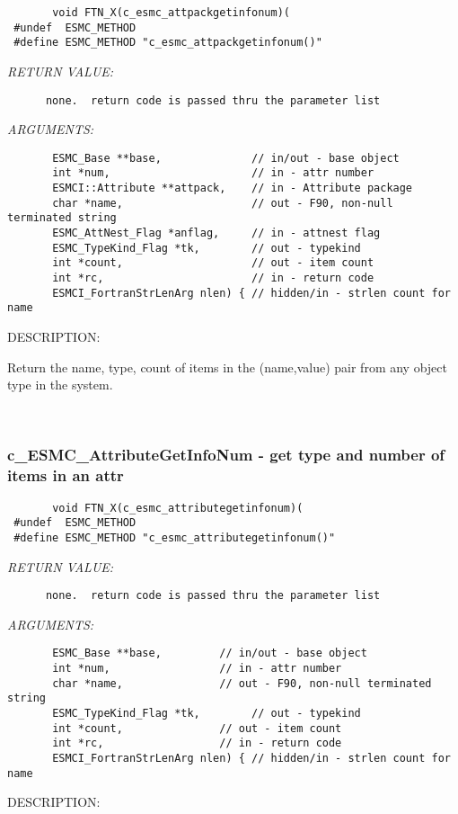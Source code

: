   
\begin{verbatim}       void FTN_X(c_esmc_attpackgetinfonum)(
 #undef  ESMC_METHOD
 #define ESMC_METHOD "c_esmc_attpackgetinfonum()"\end{verbatim}{\em RETURN VALUE:}
\begin{verbatim}      none.  return code is passed thru the parameter list
   \end{verbatim}{\em ARGUMENTS:}
\begin{verbatim}       ESMC_Base **base,              // in/out - base object
       int *num,                      // in - attr number
       ESMCI::Attribute **attpack,    // in - Attribute package
       char *name,                    // out - F90, non-null terminated string
       ESMC_AttNest_Flag *anflag,     // in - attnest flag
       ESMC_TypeKind_Flag *tk,        // out - typekind
       int *count,                    // out - item count
       int *rc,                       // in - return code
       ESMCI_FortranStrLenArg nlen) { // hidden/in - strlen count for name
   \end{verbatim}
{\sf DESCRIPTION:\\ }


     Return the name, type, count of items in the (name,value) pair from any 
     object type in the system.
   
 
\mbox{}\hrulefill\ 
 
\subsubsection [c\_ESMC\_AttributeGetInfoNum] {c\_ESMC\_AttributeGetInfoNum - get type and number of items in an attr}


  
\begin{verbatim}       void FTN_X(c_esmc_attributegetinfonum)(
 #undef  ESMC_METHOD
 #define ESMC_METHOD "c_esmc_attributegetinfonum()"\end{verbatim}{\em RETURN VALUE:}
\begin{verbatim}      none.  return code is passed thru the parameter list
   \end{verbatim}{\em ARGUMENTS:}
\begin{verbatim}       ESMC_Base **base,         // in/out - base object
       int *num,                 // in - attr number
       char *name,               // out - F90, non-null terminated string
       ESMC_TypeKind_Flag *tk,        // out - typekind
       int *count,               // out - item count
       int *rc,                  // in - return code
       ESMCI_FortranStrLenArg nlen) { // hidden/in - strlen count for name
   \end{verbatim}
{\sf DESCRIPTION:\\ }


